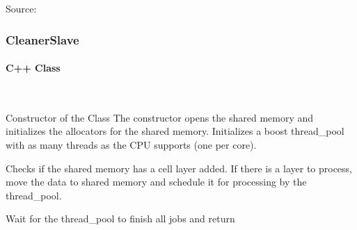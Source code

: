 \documentclass[a4paper,10pt,english]{sphinxmanual}
\begin{document}
Source: {\hyperref[\detokenize{source_code/cleanermain_source:cmainsource}]{}}


\subsubsection{CleanerSlave}
\label{\detokenize{drc/drc:cleanerslave}}\label{\detokenize{drc/drc:cs}}

\paragraph{C++ Class}
\label{\detokenize{drc/drc:id1}}

\begin{fulllineitems}
\label{\detokenize{drc/drc:_CPPv412CleanerSlave}}%
\pysigstartmultiline
{}%
\pysigstopmultiline~

\begin{fulllineitems}
\label{\detokenize{drc/drc:_CPPv4N12CleanerSlave12CleanerSlaveE}}%
\pysigstartmultiline
{}%
\pysigstopmultiline
Constructor of the Class
The constructor opens the shared memory and initializes the allocators for the shared memory. Initializes a boost thread\_pool with as many threads as the CPU supports (one per core).

\end{fulllineitems}


\begin{fulllineitems}
\label{\detokenize{drc/drc:_CPPv4N12CleanerSlave5cleanE}}%
\pysigstartmultiline
{}%
\pysigstopmultiline
Checks if the shared memory has a cell layer added. If there is a layer to process, move the data to shared memory and schedule it for processing by the thread\_pool.

\end{fulllineitems}


\begin{fulllineitems}
\label{\detokenize{drc/drc:_CPPv4N12CleanerSlave12join_threadsE}}%
\pysigstartmultiline
{}%
\pysigstopmultiline
Wait for the thread\_pool to finish all jobs and return

\end{fulllineitems}


\end{fulllineitems}
\end{document}
